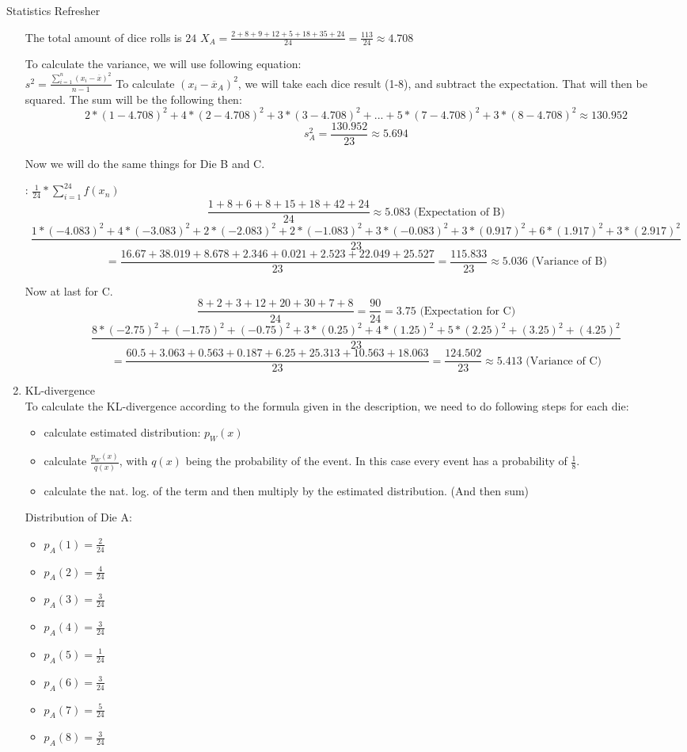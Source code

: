 \documentclass[
	english,
        solution=true
	]{tudaexercise}
\begin{document}
\begin{task}[points=15]{Statistics Refresher}
\begin{subtask}[points=4,title=Unbiased Estimators and KL-Divergence]
\begin{solution}
\begin{enumerate}
    The total amount of dice rolls is $24$
    $X_A=\frac{2+8+9+12+5+18+35+24}{24}=\frac{113}{24}\approx 4.708$

    To calculate the variance, we will use following equation:\\
    $s^2=\frac{\sum^n_{i=1} (x_i-\overline{x})^2}{n-1}$
    To calculate $(x_i-\overline{x}_A)^2$, we will take each dice result (1-8), and subtract the expectation. That will then be squared. The sum will be the following then: 
    \[2*(1-4.708)^2+4*(2-4.708)^2+3*(3-4.708)^2+...+5*(7-4.708)^2+3*(8-4.708)^2\approx 130.952\]
    \[s^2_A=\frac{130.952}{23}\approx 5.694\]

    Now we will do the same things for Die B and C.

    : $\frac{1}{24} * \sum^{24}_{i=1} f(x_n)$
    \[\frac{1+8+6+8+15+18+42+24}{24}\approx 5.083 \text{ (Expectation of B)}\]
    \[\frac{1*(-4.083)^2+4*(-3.083)^2+2*(-2.083)^2+2*(-1.083)^2+3*(-0.083)^2+3*(0.917)^2+6*(1.917)^2+3*(2.917)^2}{23}\]
    \[=\frac{16.67+38.019+8.678+2.346+0.021+2.523+22.049+25.527}{23}=\frac{115.833}{23}\approx5.036 \text{ (Variance of B)}\]

    Now at last for C.
    \[\frac{8+2+3+12+20+30+7+8}{24}=\frac{90}{24}=3.75 \text{ (Expectation for C)}\]
    \[\frac{8*(-2.75)^2+(-1.75)^2+(-0.75)^2+3*(0.25)^2+4*(1.25)^2+5*(2.25)^2+(3.25)^2+(4.25)^2}{23} \]
    \[=\frac{60.5+3.063+0.563+0.187+6.25+25.313+10.563+18.063}{23}=\frac{124.502}{23}\approx 5.413 \text{ (Variance of C)}\]

\item KL-divergence\\
To calculate the KL-divergence according to the formula given in the description, we need to do following steps for each die:
\begin{itemize}
    \item calculate estimated distribution: $p_W(x)$
    \item calculate $\frac{p_W(x)}{q(x)}$, with $q(x)$ being the probability of the event. In this case every event has a probability of $\frac{1}{8}$.
    \item calculate the nat. log. of the term and then multiply by the estimated distribution. (And then sum)
\end{itemize}

Distribution of Die A:
\begin{itemize}
    \item $p_A(1)=\frac{2}{24}$
    \item $p_A(2)=\frac{4}{24}$
    \item $p_A(3)=\frac{3}{24}$
    \item $p_A(4)=\frac{3}{24}$
    \item $p_A(5)=\frac{1}{24}$
    \item $p_A(6)=\frac{3}{24}$
    \item $p_A(7)=\frac{5}{24}$
    \item $p_A(8)=\frac{3}{24}$
\end{itemize}


\end{enumerate}
\end{solution}
\end{subtask}
\end{task}
\end{document}
